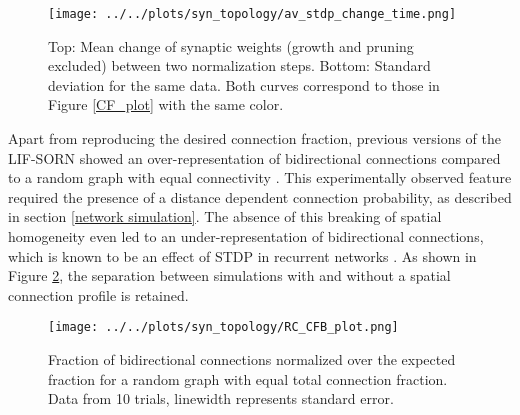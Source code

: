 \documentclass[10pt,a4paper]{article}
\begin{document}
\begin{figure}
\texttt{[image: ../../plots/syn\_topology/av\_stdp\_change\_time.png]}
\caption{Top: Mean change of synaptic weights (growth and pruning excluded) between two normalization steps. Bottom: Standard deviation for the same data. Both curves correspond to those in Figure \ref{CF_plot} with the same color.}
\label{STDP_change}
\end{figure}
Apart from reproducing the desired connection fraction, previous versions of the LIF-SORN showed an over-representation of bidirectional connections compared to a random graph with equal connectivity \cite{SORN_Paper}. This experimentally observed feature required the presence of a distance dependent connection probability, as described in section \ref{network simulation}. The absence of this breaking of spatial homogeneity even led to an under-representation of bidirectional connections, which is known to be an effect of STDP in recurrent networks \cite{Syn_Plast_Abbott}. As shown in Figure \ref{RC_CFB_plot}, the separation between simulations with and without a spatial connection profile is retained. 
\begin{figure}
\texttt{[image: ../../plots/syn\_topology/RC\_CFB\_plot.png]}
\caption{Fraction of bidirectional connections normalized over the expected fraction for a random graph with equal total connection fraction. Data from 10 trials, linewidth represents standard error.}
\label{RC_CFB_plot}
\end{figure}
\end{document}
